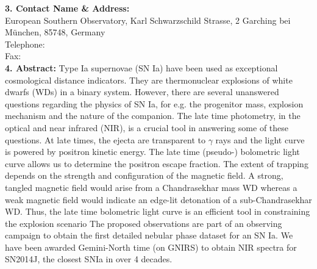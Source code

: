 \documentclass[11pt]{article}
\begin{document}
%
{\bf 3. Contact Name \& Address: }\\
European Southern Observatory,
Karl Schwarzschild Strasse, 2
Garching bei M{\"u}nchen, 85748, 
Germany
\\
Telephone:\\
Fax:\\
%
\textbf{ 4. Abstract: }
Type Ia supernovae (SN Ia) have been used as exceptional cosmological distance indicators. They are thermonuclear explosions of white dwarfs (WDs) in a binary system. However, there are several unanswered questions regarding the physics  of SN Ia, for e.g. the progenitor mass, explosion mechanism and the nature of the companion. The late time photometry, in the optical and near infrared (NIR), is a crucial tool in answering some of these questions. At late times, the ejecta are transparent to $\gamma$ rays and the light curve is powered by positron kinetic energy. The late time (pseudo-) bolometric light curve allows us to determine the positron escape fraction. The extent of trapping depends on the strength and configuration of the magnetic field. A strong, tangled magnetic field would arise from a Chandrasekhar mass WD whereas a weak magnetic field would indicate an edge-lit detonation of a sub-Chandrasekhar WD. Thus, the late time bolometric light curve is an efficient tool in constraining the explosion scenario
The proposed observations are part of an observing campaign to obtain the first detailed nebular phase dataset for an SN Ia. We have been awarded Gemini-North time (on GNIRS) to obtain NIR spectra for SN2014J, the closest SNIa in over 4 decades.  %
\end{document}

